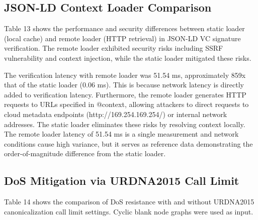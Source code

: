 \documentclass[conference]{IEEEtran}
\begin{document}
\subsection{JSON-LD Context Loader Comparison}

Table 13 shows the performance and security differences between static loader (local cache) and remote loader (HTTP retrieval) in JSON-LD VC signature verification. The remote loader exhibited security risks including SSRF vulnerability and context injection, while the static loader mitigated these risks.


\begin{table}[!t]
\centering
\caption{Table 13. JSON-LD Context Loader Comparison (N=5, exploratory; browser mode of the benchmark tool)}\label{tab:13}
\footnotesize
{}
\end{table}

The verification latency with remote loader was 51.54 ms, approximately 859x that of the static loader (0.06 ms). This is because network latency is directly added to verification latency. Furthermore, the remote loader generates HTTP requests to URLs specified in @context, allowing attackers to direct requests to cloud metadata endpoints (http://169.254.169.254/) or internal network addresses. The static loader eliminates these risks by resolving context locally. The remote loader latency of 51.54 ms is a single measurement and network conditions cause high variance, but it serves as reference data demonstrating the order-of-magnitude difference from the static loader.

\subsection{DoS Mitigation via URDNA2015 Call Limit}

Table 14 shows the comparison of DoS resistance with and without URDNA2015 canonicalization call limit settings. Cyclic blank node graphs were used as input.
\end{document}
